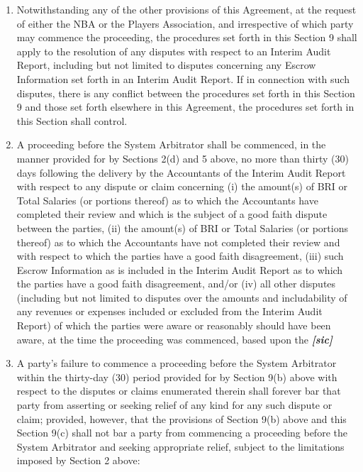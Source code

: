 \documentclass[
]{book}
\providecommand{\tightlist}{%
  \setlength{\itemsep}{0pt}\setlength{\parskip}{0pt}}
\begin{document}
\begin{enumerate}
\def\labelenumi{(\alph{enumi})}
\tightlist
\item
  Notwithstanding any of the other provisions of this Agreement, at the request of either the NBA or the Players Association, and irrespective of which party may commence the proceeding, the procedures set forth in this Section 9 shall apply to the resolution of any disputes with respect to an Interim Audit Report, including but not limited to disputes concerning any Escrow Information set forth in an Interim Audit Report. If in connection with such disputes, there is any conflict between the procedures set forth in this Section 9 and those set forth elsewhere in this Agreement, the procedures set forth in this Section shall control.
\item
  A proceeding before the System Arbitrator shall be commenced, in the manner provided for by Sections 2(d) and 5 above, no more than thirty (30) days following the delivery by the Accountants of the Interim Audit Report with respect to any dispute or claim concerning (i) the amount(s) of BRI or Total Salaries (or portions thereof) as to which the Accountants have completed their review and which is the subject of a good faith dispute between the parties, (ii) the amount(s) of BRI or Total Salaries (or portions thereof) as to which the Accountants have not completed their review and with respect to which the parties have a good faith disagreement, (iii) such Escrow Information as is included in the Interim Audit Report as to which the parties have a good faith disagreement, and/or (iv) all other disputes (including but not limited to disputes over the amounts and includability of any revenues or expenses included or excluded from the Interim Audit Report) of which the parties were aware or reasonably should have been aware, at the time the proceeding was commenced, based upon the \textbf{\emph{{[}sic{]}}}
\item
  A party's failure to commence a proceeding before the System Arbitrator within the thirty-day (30) period provided for by Section 9(b) above with respect to the disputes or claims enumerated therein shall forever bar that party from asserting or seeking relief of any kind for any such dispute or claim; provided, however, that the provisions of Section 9(b) above and this Section 9(c) shall not bar a party from commencing a proceeding before the System Arbitrator and seeking appropriate relief, subject to the limitations imposed by Section 2 above:


\end{enumerate}
\end{document}
